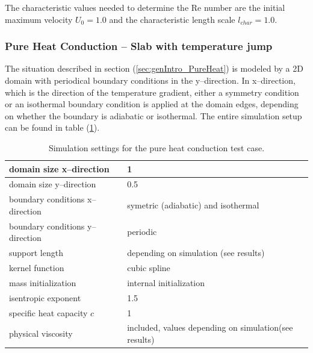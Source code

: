 \documentclass[11pt,a4paper,twoside]{report}
\begin{document}
The characteristic values needed to determine the Re number are the initial maximum  velocity $U_0=1.0$ and the characteristic length scale $l_\mathit{char}=1.0$.


\subsubsection{Pure Heat Conduction -- Slab with temperature jump}
\label{sec:simuSetup_PureHeat}

The situation described in section (\ref{sec:genIntro_PureHeat}) is modeled by a 2D domain with periodical boundary conditions in the y--direction. In x--direction, which is the direction of the temperature gradient, either a symmetry condition or an isothermal boundary condition is applied at the domain edges, depending on whether the boundary is adiabatic or isothermal. The entire simulation setup can be found in table (\ref{tab:SimuSettings_PureHeat}).

\begin{table}[h] %
\label{tab:SimuSettings_PureHeat}
\centering

\begin{tabular}[c]{|l|p{5cm}|} %
\hline
\hline
domain size x--direction &  1\\
\hline
domain size y--direction &  0.5\\
\hline
boundary conditions x--direction & symetric (adiabatic) and isothermal\\
\hline
boundary conditions y--direction & periodic\\
\hline
support length & depending on simulation \newline (see results)  \\
\hline
kernel function & cubic spline \\
\hline
mass initialization & internal initialization \\
\hline
isentropic exponent & 1.5\\
\hline
specific heat capacity  $c$ & 1 \\
\hline
physical viscosity& included, values depending on simulation\newline (see results)\\ 
\hline
\hline
\end{tabular}
\caption[]{Simulation settings for the pure heat conduction test case.}

\end{table}
\end{document}
